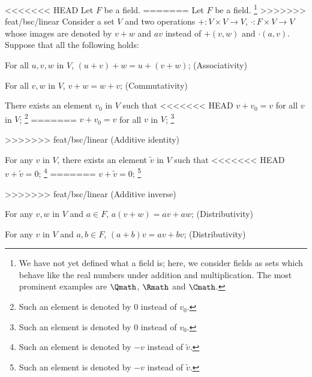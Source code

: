 \begin{example}
\begin{definition}
    \label{def:vectorspace}
<<<<<<< HEAD
    Let \(F\) be a field.
=======
    Let \(F\) be a field.%
    \footnote{We have not yet defined what a field is;
    here, we consider fields as sets which behave like the real numbers
    under addition and multiplication.
    The most prominent examples are
    \(\Qmath\), \(\Rmath\) and \(\Cmath\).}
>>>>>>> feat/bsc/linear
    Consider a set \(V\) and two operations
    \(+:V\times V\to V\), \(\cdot:F\times V\to V\)
    whose images are denoted by \(v+w\) and \(av\)
    instead of \(+(v,w)\) and \(\cdot(a,v)\).
    Suppose that all the following holds:
    \begin{axioms}[Vsp]
        \item For all \(u,v,w\) in \(V\), \((u+v)+w=u+(v+w)\);
        \hfill\textsf{(Associativity)}

        \item For all \(v,w\) in \(V\), \(v+w=w+v\);
        \hfill\textsf{(Commutativity)}

        \item There exists an element \(v_0\) in \(V\) such that
<<<<<<< HEAD
        \(v+v_0=v\) for all \(v\) in \(V\);
        \footnote{
            Such an element is denoted by \(0\)
            instead of \(v_0\).}
=======
        \(v+v_0=v\) for all \(v\) in \(V\);%
        \footnote{
            Such an element is denoted by \(0\)
            instead of \(v_0\).}

>>>>>>> feat/bsc/linear
        \hfill\textsf{(Additive identity)}

        \item For any \(v\) in \(V\),
        there exists an element \(\tilde v\) in \(V\) such that
<<<<<<< HEAD
        \(v+\tilde v=0\);
        \footnote{
            Such an element is denoted by \(-v\)
            instead of \(\tilde v\).}
=======
        \(v+\tilde v=0\);%
        \footnote{
            Such an element is denoted by \(-v\)
            instead of \(\tilde v\).}

>>>>>>> feat/bsc/linear
        \hfill\textsf{(Additive inverse)}

        \item For any \(v,w\) in \(V\) and \(a\in F\),
        \(a(v+w)=av+aw\);
        \hfill\textsf{(Distributivity)}

        \item For any \(v\) in \(V\) and \(a,b\in F\),
        \((a+b)v=av+bv\);
        \hfill\textsf{(Distributivity)}


\end{axioms}
\end{definition}
\end{example}
